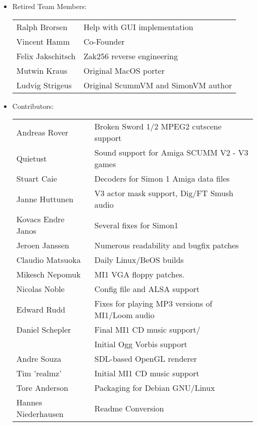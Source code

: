 \begin{itemize}
\begin{tabular}[h]{ll}
  \end{tabular}
\item Retired Team Members:\\
  \begin{tabular}[h]{ll}
    Ralph Brorsen        & Help with GUI implementation\\
    Vincent Hamm         & Co-Founder\\
    Felix Jakschitsch    & Zak256 reverse engineering\\
    Mutwin Kraus         & Original MacOS porter\\
    Ludvig Strigeus      & Original ScummVM and SimonVM author\\
  \end{tabular}
\item Contributors:\\
  \begin{tabular}{ll}
    Andreas Rover        & Broken Sword 1/2 MPEG2 cutscene support\\
    Quietust             & Sound support for Amiga SCUMM V2 - V3 games\\
    Stuart Caie          & Decoders for Simon 1 Amiga data files\\
    Janne Huttunen       & V3 actor mask support, Dig/FT Smush audio\\
    Kovacs Endre Janos   & Several fixes for Simon1\\
    Jeroen Janssen       & Numerous readability and bugfix patches\\
    Claudio Matsuoka     & Daily Linux/BeOS builds \\
    Mikesch Nepomuk      & MI1 VGA floppy patches.\\
    Nicolas Noble        & Config file and ALSA support\\
    Edward Rudd          & Fixes for playing MP3 versions of MI1/Loom audio\\
    Daniel Schepler      & Final MI1 CD music support/\\
                         & Initial Ogg Vorbis support\\
    Andre Souza          & SDL-based OpenGL renderer\\
    Tim 'realmz'         & Initial MI1 CD music support\\
    Tore Anderson        & Packaging for Debian GNU/Linux\\
    Hannes Niederhausen  & Readme Conversion\\
  \end{tabular}
  

\end{itemize}
